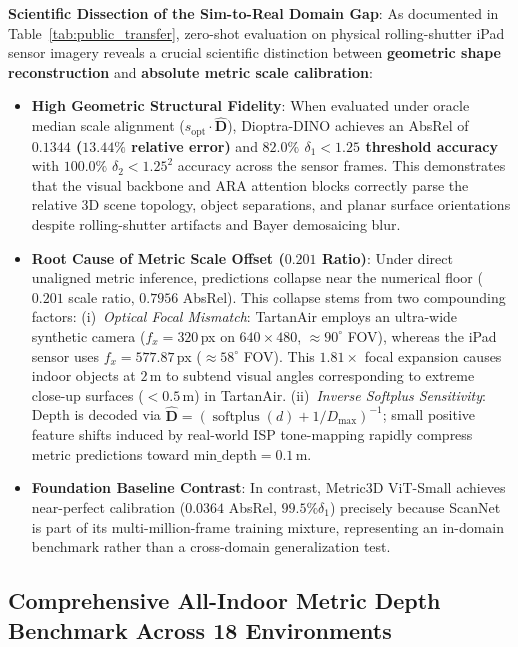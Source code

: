 \noindent\textbf{Scientific Dissection of the Sim-to-Real Domain Gap}: 
As documented in Table~\ref{tab:public_transfer}, zero-shot evaluation on physical rolling-shutter iPad sensor imagery reveals a crucial scientific distinction between \textbf{geometric shape reconstruction} and \textbf{absolute metric scale calibration}:
\begin{itemize}
    \item \textbf{High Geometric Structural Fidelity}: When evaluated under oracle median scale alignment ($s_{\text{opt}} \cdot \hat{\mathbf{D}}$), Dioptra-DINO achieves an AbsRel of \textbf{$0.1344$ ($13.44\%$ relative error)} and \textbf{$82.0\%$ $\delta_1 < 1.25$ threshold accuracy} with $100.0\%$ $\delta_2 < 1.25^2$ accuracy across the sensor frames. This demonstrates that the visual backbone and ARA attention blocks correctly parse the relative 3D scene topology, object separations, and planar surface orientations despite rolling-shutter artifacts and Bayer demosaicing blur.
    \item \textbf{Root Cause of Metric Scale Offset ($0.201$ Ratio)}: Under direct unaligned metric inference, predictions collapse near the numerical floor ($0.201$ scale ratio, $0.7956$ AbsRel). This collapse stems from two compounding factors: (i)~\textit{Optical Focal Mismatch}: TartanAir employs an ultra-wide synthetic camera ($f_x = 320$\,px on $640 \times 480$, $\approx 90^\circ$ FOV), whereas the iPad sensor uses $f_x = 577.87$\,px ($\approx 58^\circ$ FOV). This $1.81\times$ focal expansion causes indoor objects at $2$\,m to subtend visual angles corresponding to extreme close-up surfaces ($<0.5$\,m) in TartanAir. (ii)~\textit{Inverse Softplus Sensitivity}: Depth is decoded via $\hat{\mathbf{D}} = (\operatorname{softplus}(d) + 1/D_{\max})^{-1}$; small positive feature shifts induced by real-world ISP tone-mapping rapidly compress metric predictions toward $\text{min\_depth} = 0.1$\,m.
    \item \textbf{Foundation Baseline Contrast}: In contrast, Metric3D ViT-Small achieves near-perfect calibration ($0.0364$ AbsRel, $99.5\% \delta_1$) precisely because ScanNet is part of its multi-million-frame training mixture, representing an in-domain benchmark rather than a cross-domain generalization test.
\end{itemize}

\subsection{Comprehensive All-Indoor Metric Depth Benchmark Across 18 Environments}
\label{sec:indoor_suite_benchmark}

